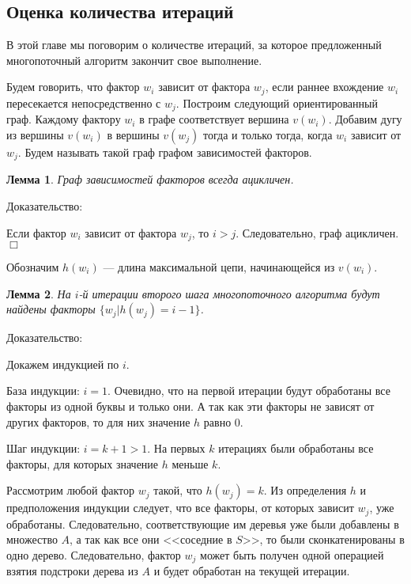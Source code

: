 \documentclass[14pt]{article}
\newtheorem{lemma}{Лемма}[section]
\begin{document}
\subsection{Оценка количества итераций}

В этой главе мы поговорим о количестве итераций, за которое предложенный многопоточный алгоритм закончит свое выполнение.

Будем говорить, что фактор $w_i$ зависит от фактора $w_j$, если раннее вхождение $w_i$ пересекается непосредственно с $w_j$. 
Построим следующий ориентированный граф. Каждому фактору $w_i$ в графе соответствует вершина $v(w_i)$.
Добавим дугу из вершины $v(w_i)$ в вершины $v(w_j)$ тогда и только тогда, когда $w_i$ зависит от $w_j$.
Будем называть такой граф графом зависимостей факторов.

\begin{lemma}
	Граф зависимостей факторов всегда ацикличен.
\end{lemma}

{\sc Доказательство:}

Если фактор $w_i$ зависит от фактора $w_j$, то $i > j$. Следовательно, граф ацикличен. $\Box$

Обозначим $h(w_i)$ --- длина максимальной цепи, начинающейся из $v(w_i)$.

\begin{lemma}
	На $i$-й итерации второго шага многопоточного алгоритма будут найдены факторы $\{w_j | h(w_j) = i - 1\}$.
\end{lemma}

{\sc Доказательство:}

Докажем индукцией по $i$.

База индукции: $i = 1$. Очевидно, что на первой итерации будут обработаны все факторы из одной буквы и только они. А так как эти факторы
не зависят от других факторов, то для них значение $h$ равно 0.

Шаг индукции: $i = k + 1 > 1$. На первых $k$ итерациях были обработаны все факторы, для которых значение $h$ меньше $k$.

Рассмотрим любой фактор $w_j$ такой, что $h(w_j) = k$. Из определения $h$ и предположения индукции следует,
что все факторы, от которых зависит $w_j$, уже обработаны. Следовательно, соответствующие им деревья уже были добавлены в множество $A$,
а так как все они <<соседние в $S$>>, то были сконкатенированы в одно дерево. Следовательно, фактор $w_j$ может быть получен одной операцией
взятия подстроки дерева из $A$ и будет обработан на текущей итерации.
\end{document}
